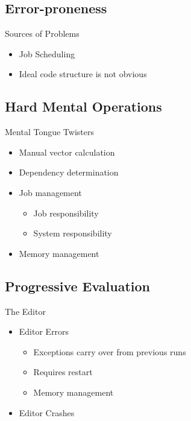 \subsection{Error-proneness}
\begin{frame}{\secname}{\subsecname}
	Sources of Problems
	\begin{itemize}
		\item<2-> Job Scheduling
		\item<3-> Ideal code structure is not obvious
	\end{itemize}
\end{frame}

\subsection{Hard Mental Operations}
\begin{frame}{\secname}{\subsecname}
	Mental Tongue Twisters
	\begin{itemize}
		\item<2-> Manual vector calculation
		\item<3-> Dependency determination
		\item<4-> Job management
		\begin{itemize}
			\item<5-> Job responsibility
			\item<6-> System responsibility
		\end{itemize}
		\item<7-> Memory management
	\end{itemize}
\end{frame}

\subsection{Progressive Evaluation}
\begin{frame}{\secname}{\subsecname}
	The Editor
	\begin{itemize}
		\item<2-> Editor Errors
		\begin{itemize}
			\item<3-> Exceptions carry over from previous runs
			\item<4-> Requires restart
			\item<5-> Memory management
		\end{itemize}
		\item<6-> Editor Crashes
	\end{itemize}
\end{frame}

